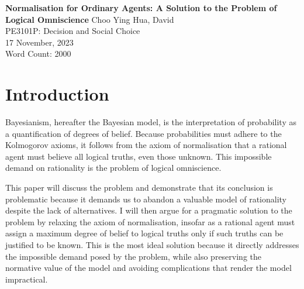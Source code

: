 \documentclass[12pt]{article}
\renewcommand{\maketitle}{%
    \begin{titlepage}
        \begin{center}
            \vfill
            \vspace*{\baselineskip}
            \vfill
            \textbf{Normalisation for Ordinary Agents: A Solution to the Problem of Logical Omniscience}
            \vfill
            Choo Ying Hua, David\\
            PE3101P: Decision and Social Choice\\
            17 November, 2023\\
            Word Count: 2000
            \vfill
        \end{center}
    \end{titlepage}
    }
\begin{document}
\maketitle
\section{Introduction}
Bayesianism, hereafter the Bayesian model, is the interpretation of probability as a quantification of degrees of belief. Because probabilities must adhere to the Kolmogorov axioms, it follows from the axiom of normalisation that a rational agent must believe all logical truths, even those unknown. This impossible demand on rationality is the problem of logical omniscience.

This paper will discuss the problem and demonstrate that its conclusion is problematic because it demands us to abandon a valuable model of rationality despite the lack of alternatives. I will then argue for a pragmatic solution to the problem by relaxing the axiom of normalisation, insofar as a rational agent must assign a maximum degree of belief to logical truths only if such truths can be justified to be known. This is the most ideal solution because it directly addresses the impossible demand posed by the problem, while also preserving the normative value of the model and avoiding complications that render the model impractical.
\end{document}
